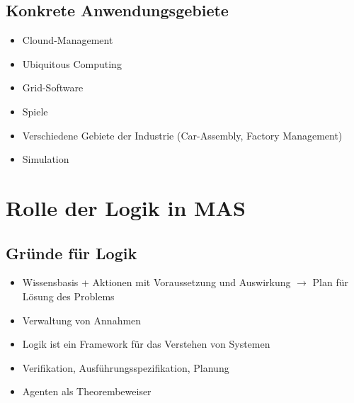 \documentclass{article} %
\begin{document}
	\subsection{Konkrete Anwendungsgebiete}
	\begin{itemize}
		\item Clound-Management
		\item Ubiquitous Computing
		\item Grid-Software
		\item Spiele
		\item Verschiedene Gebiete der Industrie (Car-Assembly, Factory Management)
		\item Simulation
	\end{itemize}
	
\section{Rolle der Logik in MAS}
	\subsection{Gründe für Logik}
	\begin{itemize}
		\item Wissensbasis + Aktionen mit Voraussetzung und Auswirkung $\rightarrow$ Plan für Lösung des Problems
		\item Verwaltung von Annahmen
		\item Logik ist ein Framework für das Verstehen von Systemen
		\item Verifikation, Ausführungsspezifikation, Planung
		\item Agenten als Theorembeweiser
	\end{itemize}
\end{document}
